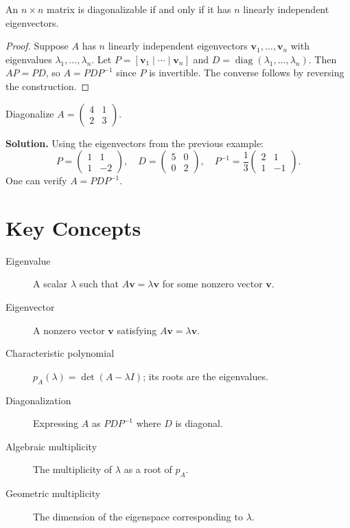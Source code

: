 \documentclass[
    language=english,
    doctype=lecture-notes,
    institution=none,
]{../../omnilatex}
\begin{document}
\begin{theorem}
An $n \times n$ matrix is diagonalizable if and only if it has $n$ linearly
independent eigenvectors.
\end{theorem}

\begin{proof}
Suppose $A$ has $n$ linearly independent eigenvectors $\mathbf{v}_1,
\ldots, \mathbf{v}_n$ with eigenvalues $\lambda_1, \ldots, \lambda_n$.
Let $P = [\mathbf{v}_1 \mid \cdots \mid \mathbf{v}_n]$ and $D =
\operatorname{diag}(\lambda_1, \ldots, \lambda_n)$.  Then $AP = PD$,
so $A = PDP^{-1}$ since $P$ is invertible.  The converse follows by
reversing the construction.
\end{proof}

\begin{example}
Diagonalize $A = \begin{pmatrix} 4 & 1 \\ 2 & 3 \end{pmatrix}$.

\textbf{Solution.}  Using the eigenvectors from the previous example:
\[
    P = \begin{pmatrix} 1 & 1 \\ 1 & -2 \end{pmatrix}, \quad
    D = \begin{pmatrix} 5 & 0 \\ 0 & 2 \end{pmatrix}, \quad
    P^{-1} = \frac{1}{3}\begin{pmatrix} 2 & 1 \\ 1 & -1 \end{pmatrix}.
\]
One can verify $A = PDP^{-1}$.
\end{example}

\section{Key Concepts}

\begin{description}
    \item[Eigenvalue] A scalar $\lambda$ such that $A\mathbf{v} = \lambda\mathbf{v}$
          for some nonzero vector $\mathbf{v}$.
    \item[Eigenvector] A nonzero vector $\mathbf{v}$ satisfying $A\mathbf{v} =
          \lambda\mathbf{v}$.
    \item[Characteristic polynomial] $p_A(\lambda) = \det(A - \lambda I)$;
          its roots are the eigenvalues.
    \item[Diagonalization] Expressing $A$ as $PDP^{-1}$ where $D$ is diagonal.
    \item[Algebraic multiplicity] The multiplicity of $\lambda$ as a root of
          $p_A$.
    \item[Geometric multiplicity] The dimension of the eigenspace corresponding
          to $\lambda$.
\end{description}
\end{document}
